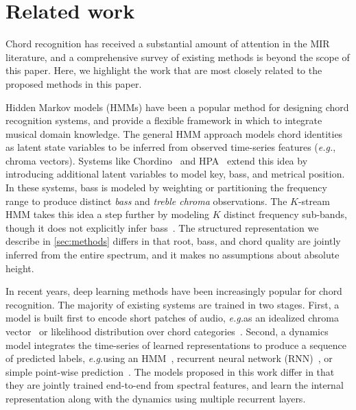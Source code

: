 \documentclass{article}
\def\eg{\emph{e.g.\/}}
\begin{document}
%
\section{Related work}

Chord recognition has received a substantial amount of attention in the MIR literature, and a comprehensive survey of existing methods is beyond the scope of this paper.
Here, we highlight the work that are most closely related to the proposed methods in this paper.

Hidden Markov models (HMMs) have been a popular method for designing chord recognition systems, and provide a flexible framework in which to integrate musical domain knowledge.
The general HMM approach models chord identities as latent state variables to be inferred from observed time-series features (\eg, chroma vectors).
Systems like Chordino~\cite{mauchsimple} and HPA~\cite{ni2012end} extend this idea by introducing additional latent variables to model key, bass, and metrical position.
In these systems, bass is modeled by weighting or partitioning the frequency range to produce distinct \emph{bass} and \emph{treble chroma} observations.
The $K$-stream HMM takes this idea a step further by modeling $K$ distinct frequency sub-bands, though it does not explicitly infer bass~\cite{cho2014improved}.
The structured representation we describe in \cref{sec:methods} differs in that root, bass, and chord quality are jointly inferred from the entire spectrum, and it makes no assumptions about absolute height.



%   

In recent years, deep learning methods have been increasingly popular for chord recognition.
The majority of existing systems are trained in two stages. 
First, a model is built first to encode short patches of audio, \eg as an idealized chroma vector~\cite{boulanger2013audio,korzeniowski2016feature} or likelihood distribution over chord categories~\cite{humphrey2015four,sigtia2015audio,zhou2015chord,deng2016hybrid}.
Second, a dynamics model integrates the time-series of learned representations to produce a sequence of predicted labels, \eg using an HMM~\cite{humphrey2015four,zhou2015chord}, recurrent neural network (RNN)~\cite{boulanger2013audio,sigtia2015audio}, or simple point-wise prediction~\cite{korzeniowski2016feature}.
The models proposed in this work differ in that they are jointly trained end-to-end from spectral features, and learn the internal representation along with the dynamics using multiple recurrent layers.
\end{document}
